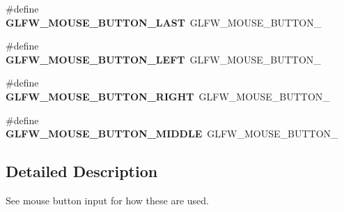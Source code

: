 \begin{DoxyCompactItemize}
\item 
\mbox{\label{group__buttons_gab1fd86a4518a9141ec7bcde2e15a2fdf}} 
\#define {\bfseries G\+L\+F\+W\+\_\+\+M\+O\+U\+S\+E\+\_\+\+B\+U\+T\+T\+O\+N\+\_\+\+L\+A\+ST}~G\+L\+F\+W\+\_\+\+M\+O\+U\+S\+E\+\_\+\+B\+U\+T\+T\+O\+N\+\_
\item 
\mbox{\label{group__buttons_gaf37100431dcd5082d48f95ee8bc8cd56}} 
\#define {\bfseries G\+L\+F\+W\+\_\+\+M\+O\+U\+S\+E\+\_\+\+B\+U\+T\+T\+O\+N\+\_\+\+L\+E\+FT}~G\+L\+F\+W\+\_\+\+M\+O\+U\+S\+E\+\_\+\+B\+U\+T\+T\+O\+N\+\_
\item 
\mbox{\label{group__buttons_ga3e2f2cf3c4942df73cc094247d275e74}} 
\#define {\bfseries G\+L\+F\+W\+\_\+\+M\+O\+U\+S\+E\+\_\+\+B\+U\+T\+T\+O\+N\+\_\+\+R\+I\+G\+HT}~G\+L\+F\+W\+\_\+\+M\+O\+U\+S\+E\+\_\+\+B\+U\+T\+T\+O\+N\+\_
\item 
\mbox{\label{group__buttons_ga34a4d2a701434f763fd93a2ff842b95a}} 
\#define {\bfseries G\+L\+F\+W\+\_\+\+M\+O\+U\+S\+E\+\_\+\+B\+U\+T\+T\+O\+N\+\_\+\+M\+I\+D\+D\+LE}~G\+L\+F\+W\+\_\+\+M\+O\+U\+S\+E\+\_\+\+B\+U\+T\+T\+O\+N\+\_
\end{DoxyCompactItemize}


\subsection{Detailed Description}
See mouse button input for how these are used. 